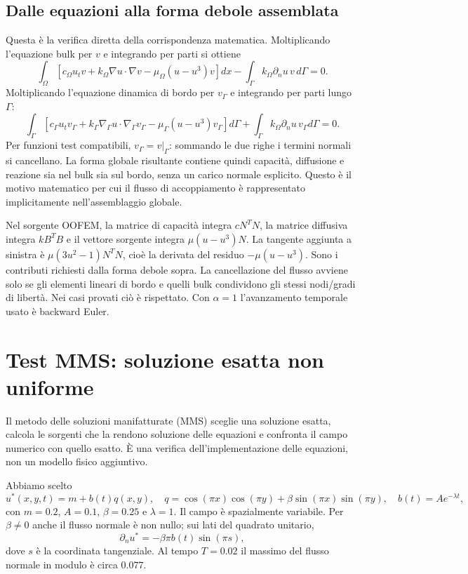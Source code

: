 \documentclass[11pt,a4paper]{article}
\begin{document}
\subsection*{Dalle equazioni alla forma debole assemblata}
Questa è la verifica diretta della corrispondenza matematica. Moltiplicando l'equazione bulk per $v$ e integrando per parti si ottiene
\[
 \int_\Omega[c_\Omega u_t v+k_\Omega\nabla u\cdot\nabla v
       -\mu_\Omega(u-u^3)v]dx
       -\int_\Gamma k_\Omega\partial_nu\,v\,d\Gamma=0.
\]
Moltiplicando l'equazione dinamica di bordo per $v_\Gamma$ e integrando per parti lungo $\Gamma$:
\[
 \int_\Gamma[c_\Gamma u_t v_\Gamma
       +k_\Gamma\nabla_\Gamma u\cdot\nabla_\Gamma v_\Gamma
       -\mu_\Gamma(u-u^3)v_\Gamma]d\Gamma
       +\int_\Gamma k_\Omega\partial_nu\,v_\Gamma d\Gamma=0.
\]
Per funzioni test compatibili, $v_\Gamma=v|_\Gamma$: sommando le due righe i termini normali si cancellano. La forma globale risultante contiene quindi capacità, diffusione e reazione sia nel bulk sia sul bordo, senza un carico normale esplicito. Questo è il motivo matematico per cui il flusso di accoppiamento è rappresentato implicitamente nell'assemblaggio globale.

Nel sorgente OOFEM, la matrice di capacità integra $cN^TN$, la matrice diffusiva integra $kB^TB$ e il vettore sorgente integra $\mu(u-u^3)N$. La tangente aggiunta a sinistra è $\mu(3u^2-1)N^TN$, cioè la derivata del residuo $-\mu(u-u^3)$. Sono i contributi richiesti dalla forma debole sopra. La cancellazione del flusso avviene solo se gli elementi lineari di bordo e quelli bulk condividono gli stessi nodi/gradi di libertà. Nei casi provati ciò è rispettato. Con $\alpha=1$ l'avanzamento temporale usato è backward Euler.

\section{Test MMS: soluzione esatta non uniforme}
Il metodo delle soluzioni manifatturate (MMS) sceglie una soluzione esatta, calcola le sorgenti che la rendono soluzione delle equazioni e confronta il campo numerico con quello esatto. È una verifica dell'implementazione delle equazioni, non un modello fisico aggiuntivo.

Abbiamo scelto
\[
 u^*(x,y,t)=m+b(t)q(x,y),\quad
 q=\cos(\pi x)\cos(\pi y)+\beta\sin(\pi x)\sin(\pi y),\quad
 b(t)=A e^{-\lambda t},
\]
con $m=0.2$, $A=0.1$, $\beta=0.25$ e $\lambda=1$. Il campo è spazialmente variabile. Per $\beta\ne0$ anche il flusso normale è non nullo; sui lati del quadrato unitario,
\[
 \partial_n u^*=-\beta\pi b(t)\sin(\pi s),
\]
dove $s$ è la coordinata tangenziale. Al tempo $T=0.02$ il massimo del flusso normale in modulo è circa $0.077$.
\end{document}
